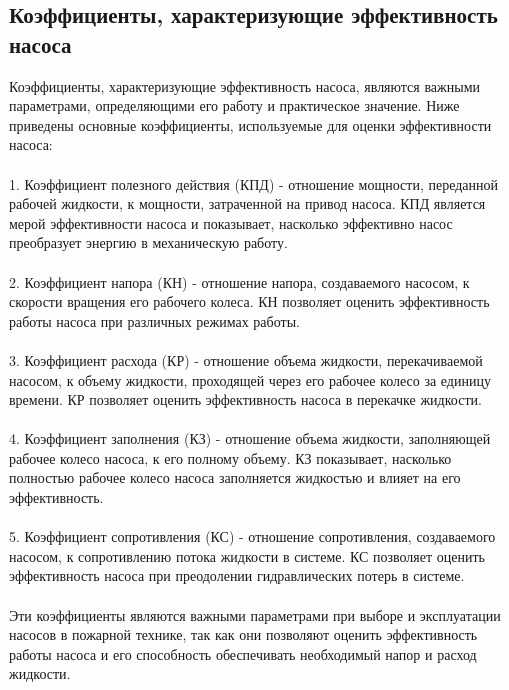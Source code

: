 \documentclass{article}
\begin{document}
\subsection{Коэффициенты, характеризующие эффективность насоса}
Коэффициенты, характеризующие эффективность насоса, являются важными параметрами, определяющими его работу и практическое значение. Ниже приведены основные коэффициенты, используемые для оценки эффективности насоса:\\
~\\
1. Коэффициент полезного действия (КПД) - отношение мощности, переданной рабочей жидкости, к мощности, затраченной на привод насоса. КПД является мерой эффективности насоса и показывает, насколько эффективно насос преобразует энергию в механическую работу.\\
~\\
2. Коэффициент напора (КН) - отношение напора, создаваемого насосом, к скорости вращения его рабочего колеса. КН позволяет оценить эффективность работы насоса при различных режимах работы.\\
~\\
3. Коэффициент расхода (КР) - отношение объема жидкости, перекачиваемой насосом, к объему жидкости, проходящей через его рабочее колесо за единицу времени. КР позволяет оценить эффективность насоса в перекачке жидкости.\\
~\\
4. Коэффициент заполнения (КЗ) - отношение объема жидкости, заполняющей рабочее колесо насоса, к его полному объему. КЗ показывает, насколько полностью рабочее колесо насоса заполняется жидкостью и влияет на его эффективность.\\
~\\
5. Коэффициент сопротивления (КС) - отношение сопротивления, создаваемого насосом, к сопротивлению потока жидкости в системе. КС позволяет оценить эффективность насоса при преодолении гидравлических потерь в системе.\\
~\\
Эти коэффициенты являются важными параметрами при выборе и эксплуатации насосов в пожарной технике, так как они позволяют оценить эффективность работы насоса и его способность обеспечивать необходимый напор и расход жидкости.
\end{document}
